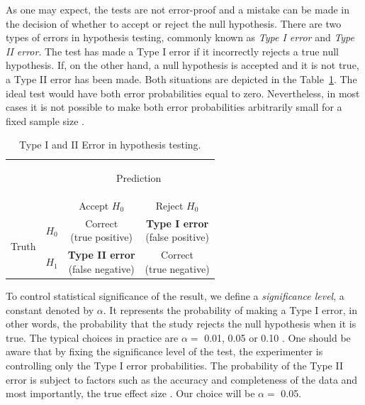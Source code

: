 As one may expect, the tests are not error-proof and a mistake can be made in the decision of whether to accept or reject the null hypothesis. There are two types of errors in hypothesis testing, commonly known as \textit{Type I error} and \textit{Type II error}. The test has made a Type I error if it incorrectly rejects a true null hypothesis. If, on the other hand, a null hypothesis is accepted and it is not true, a Type II error has been made. Both situations are depicted in the Table~\ref{tab:hypothesis_testing_errors}. The ideal test would have both error probabilities equal to zero. Nevertheless, in most cases it is not possible to make both error probabilities arbitrarily small for a fixed sample size \cite{casella}.

\begin{table}[!htbp]
\centering
\renewcommand{\arraystretch}{2.5}
\begin{tabular}{l|l|c|c|}
\multicolumn{2}{c}{}&\multicolumn{2}{c}{\begin{large}Prediction \end{large}}\\
\cline{3-4}
\multicolumn{2}{c|}{}&Accept $H_{0}$&Reject $H_{0}$\\
\cline{2-4}
\multirow{2}{*}{\begin{large}Truth\end{large}}& \textbf{$H_{0}$} & \shortstack{Correct\\(true positive)} & \shortstack{\textbf{Type I error}\\(false positive)}\\
\cline{2-4}
& \textbf{$H_{1}$} & \shortstack{\textbf{Type II error}\\(false negative)} & \shortstack{Correct\\(true negative)} \\
\cline{2-4}
\end{tabular}
\caption{Type I and II Error in hypothesis testing.}
\label{tab:hypothesis_testing_errors}
\end{table}

To control statistical significance of the result, we define a \textit{significance level}, a constant denoted by $\alpha$. It represents the probability  of making a Type I error, in other words, the probability that the study rejects the null hypothesis when it is true. The typical choices in practice are $\alpha =$ 0.01, 0.05 or 0.10 \cite{casella}. One should be aware that by fixing the significance level of the test, the experimenter is controlling only the Type I error probabilities. The probability of the Type II error is subject to factors such as the accuracy and completeness of the data and most importantly, the true effect size \cite{sham_purcell}. Our choice will be $\alpha =$ 0.05.

